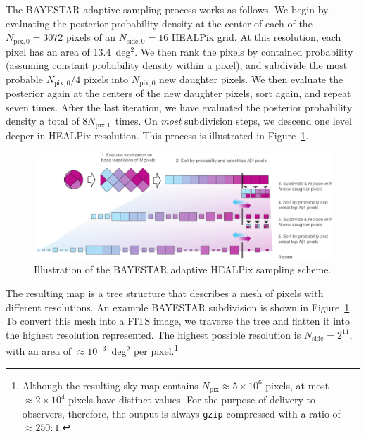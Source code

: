 \documentclass[amsmath,amssymb,aps,prx,reprint,nopreprintnumbers,nofootinbib,showpacs]{revtex4-1}
\begin{document}
The \ac{BAYESTAR} adaptive sampling process works as follows. We begin by evaluating the posterior probability density at the center of each of the $N_{\mathrm{pix},0} = 3072$ pixels of an $N_{\mathrm{side},0}=16$ \ac{HEALPix} grid. At this resolution, each pixel has an area of 13.4~deg$^2$. We then rank the pixels by contained probability (assuming constant probability density within a pixel), and subdivide the most probable $N_{\mathrm{pix},0}/4$ pixels into $N_{\mathrm{pix},0}$ new daughter pixels. We then evaluate the posterior again at the centers of the new daughter pixels, sort again, and repeat seven times. After the last iteration, we have evaluated the posterior probability density a total of $8 N_{\mathrm{pix},0}$ times. On \emph{most} subdivision steps, we descend one level deeper in \ac{HEALPix} resolution. This process is illustrated in Figure~\ref{fig:adaptive-illustration}.

\begin{figure}
    \includegraphics[width=\textwidth]{illustration}
    \caption{\label{fig:adaptive-illustration}Illustration of the \ac{BAYESTAR} adaptive HEALPix sampling scheme.}
\end{figure}

The resulting map is a tree structure that describes a mesh of pixels with different resolutions. An example \ac{BAYESTAR} subdivision is shown in Figure~\ref{fig:adaptive-illustration}. To convert this mesh into a FITS image, 
we traverse the tree and flatten it into the highest resolution represented. The highest possible resolution is $N_\mathrm{side}=2^{11}$, with an area of $\approx 10^{-3}$~deg$^2$ per pixel.\footnote{Although the resulting sky map contains $N_\mathrm{pix} \approx 5\times10^6$ pixels, at most $\approx 2\times10^4$ pixels have distinct values. For the purpose of delivery to observers, therefore, the output is always \texttt{gzip}\nobreakdashes-compressed with a ratio of $\approx 250:1$.}
\end{document}
